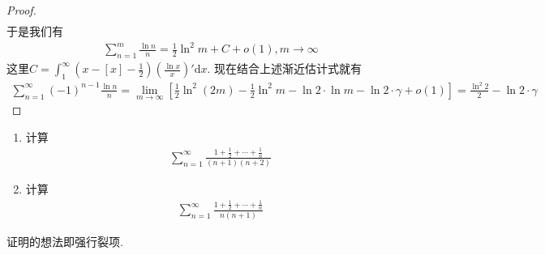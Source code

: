 \documentclass[../../main.tex]{subfiles}
\begin{document}
\begin{proof}
\begin{align*}
\end{align*}
于是我们有
\begin{align*}
\sum_{n=1}^{m} \frac{\ln n}{n} = \frac{1}{2} \ln^2 m + C + o(1), m \to \infty
\end{align*}
这里$C = \int_{1}^{\infty} \left( x - [x] - \frac{1}{2} \right) \left( \frac{\ln x}{x} \right)' \mathrm{d}x$. 现在结合上述渐近估计式就有
\begin{align*}
\sum_{n=1}^{\infty} (-1)^{n - 1} \frac{\ln n}{n} = \lim_{m \to \infty} \left[ \frac{1}{2} \ln^2 (2m) - \frac{1}{2} \ln^2 m - \ln 2 \cdot \ln m - \ln 2 \cdot \gamma + o(1) \right] = \frac{\ln^2 2}{2} - \ln 2 \cdot \gamma
\end{align*}
\end{proof}

\begin{example}
\begin{enumerate}
\item 计算
\begin{align*}
\sum_{n=1}^{\infty} \frac{1 + \frac{1}{2} + \cdots + \frac{1}{n}}{(n + 1)(n + 2)}
\end{align*}

\item 计算
\begin{align*}
\sum_{n=1}^{\infty} \frac{1 + \frac{1}{2} + \cdots + \frac{1}{n}}{n(n + 1)}
\end{align*}
\end{enumerate}
\end{example}
\begin{note}
证明的想法即强行裂项.
\end{note}
\end{document}
